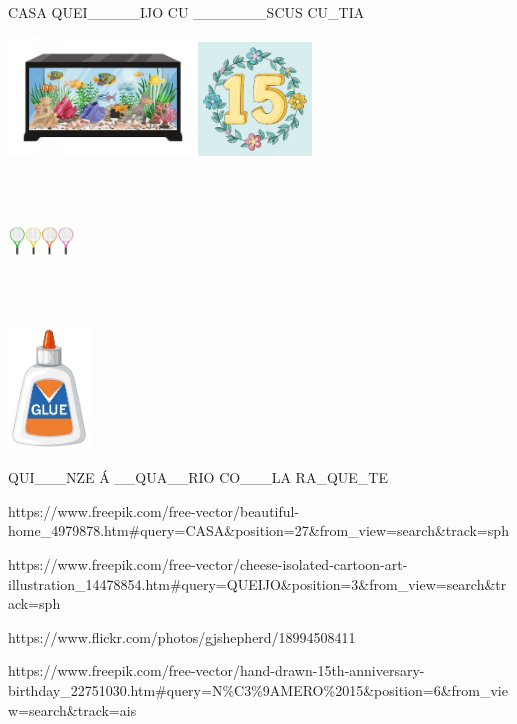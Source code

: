 {CASA QUEI\_\_\_\_\_IJO CU \_\_\_\_\_\_\_SCUS CU\_TIA

\includegraphics[width=1.98343in,height=1.24038in]{media/image30.jpeg}\includegraphics[width=1.18269in,height=1.18269in]{media/image31.jpeg}

\includegraphics[width=0.70192in,height=1.39623in]{media/image32.jpeg}

\includegraphics[width=0.85819in,height=1.27885in]{media/image33.jpeg}

QUI\_\_\_NZE Á \_\_QUA\_\_RIO CO\_\_\_LA RA\_QUE\_TE

https://www.freepik.com/free-vector/beautiful-home\_4979878.htm\#query=CASA\&position=27\&from\_view=search\&track=sph

https://www.freepik.com/free-vector/cheese-isolated-cartoon-art-illustration\_14478854.htm\#query=QUEIJO\&position=3\&from\_view=search\&track=sph

https://www.flickr.com/photos/gjshepherd/18994508411

https://www.freepik.com/free-vector/hand-drawn-15th-anniversary-birthday\_22751030.htm\#query=N\%C3\%9AMERO\%2015\&position=6\&from\_view=search\&track=ais

}
